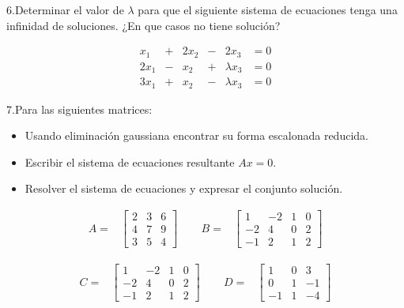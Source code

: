 \documentclass[
]{article}
\begin{document}
6.Determinar el valor de \(\lambda\) para que el siguiente sistema de
ecuaciones tenga una infinidad de soluciones. ¿En que casos no tiene
solución?

\begin{equation*}
  \begin{array}{cccccc}
     x_1        & + & 2x_2  & - & 2 x_3            & = 0  \\
    2x_1        & - &  x_2  & + &  \lambda x_3     & = 0\\
    3x_1        & + &  x_2  & - & \lambda  x_3     & = 0
  \end{array}
\end{equation*}

7.Para las siguientes matrices:

\begin{itemize}
\item Usando eliminación gaussiana encontrar su forma escalonada reducida. 
\item Escribir el sistema de ecuaciones resultante $Ax=0$.
\item Resolver el sistema de ecuaciones y expresar el conjunto solución.
\end{itemize}

\begin{equation*}
\begin{array}{ccccc}
A =& \begin{bmatrix} 
      2  & 3 & 6 \\ 
      4  & 7 & 9 \\
      3  & 5 & 4  
     \end{bmatrix} & \,\,\, &
B= & \begin{bmatrix} 
      1   & -2 & 1 & 0\\ 
      -2  &  4 & 0 & 2\\
      -1  &  2 & 1 & 2  
     \end{bmatrix}
\end{array}
\end{equation*}

\begin{equation*}
\begin{array}{ccccc}
C = & \begin{bmatrix} 
      1  &-2 & 1 & 0 \\ 
     -2  & 4 & 0 & 2\\
     -1  & 2 & 1 & 2  
     \end{bmatrix} & \,\,\, &
D = & \begin{bmatrix} 
      1   &  0 & 3 \\ 
      0   &  1 & -1\\
      -1  &  1 & -4  
     \end{bmatrix}
\end{array}
\end{equation*}
\end{document}
